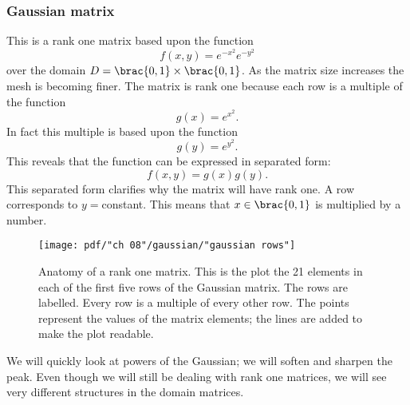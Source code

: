 \subsubsection{Gaussian matrix}
This is a rank one matrix based upon the function
\begin{equation}
  f(x,y) = e^{-x^{2}} e^{-y^{2}}
\end{equation}
over the domain $D = \brac{0,1} \times \brac{0,1}$. As the matrix size increases the mesh is becoming finer. The matrix is rank one because each row is a multiple of the function
\begin{equation}
  g(x) = e^{x^{2}}.
\end{equation}
In fact this multiple is based upon the function
\begin{equation}
  g(y) = e^{y^{2}}.
\end{equation}
This reveals that the function can be expressed in separated form:
\begin{equation*}
  f(x,y) = g(x)g(y).
\end{equation*}
This separated form clarifies why the matrix will have rank one. A row corresponds to $y=$constant. This means that $x\in\brac{0,1}$ is multiplied by a number.
\begin{figure}[htbp] %
   \centering
   \texttt{[image: pdf/"ch 08"/gaussian/"gaussian rows"]} 
   \caption[Anatomy of a rank one matrix]{Anatomy of a rank one matrix. This is the plot the 21 elements in each of the first five rows of the Gaussian matrix. The rows are labelled. Every row is a multiple of every other row. The points represent the values of the matrix elements; the lines are added to make the plot readable.}
   \label{fig:pictures:gaussian:rankone}
\end{figure}
We will quickly look at powers of the Gaussian; we will soften and sharpen the peak. Even though we will still be dealing with rank one matrices, we will see very different structures in the domain matrices.

